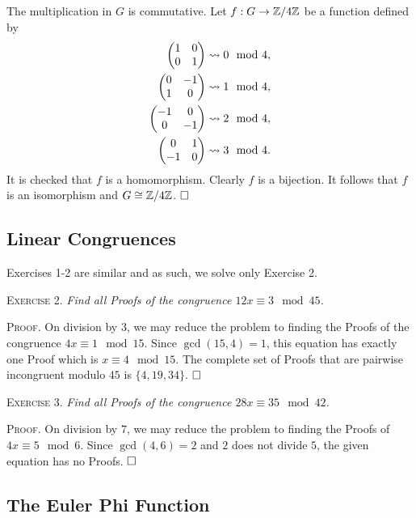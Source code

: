 \documentclass[11pt, leqno]{article}
\newcommand{\done}{\ensuremath{\hfill\square}}
\begin{document}
The multiplication in $G$ is commutative. Let $f: G \to \mathbb{Z}/4\mathbb{Z}$ be a function defined by 
\begin{align*}
  \begin{pmatrix} 1 & 0 \\ 0 & 1 \end{pmatrix} &\rightsquigarrow 0 \mod 4, \\
  \begin{pmatrix} 0 & -1 \\ 1 & 0 \end{pmatrix} &\rightsquigarrow 1 \mod 4, \\
  \begin{pmatrix} -1 & 0 \\ 0 & -1 \end{pmatrix} &\rightsquigarrow 2 \mod 4, \\
  \begin{pmatrix} 0 & 1 \\ -1 & 0 \end{pmatrix} &\rightsquigarrow 3 \mod 4.
\end{align*}
It is checked that $f$ is a homomorphism. Clearly $f$ is a bijection. It follows that $f$ is an isomorphism and $G \cong \mathbb{Z}/4\mathbb{Z}$. \done

\subsection{Linear Congruences}

Exercises 1-2 are similar and as such, we solve only Exercise 2.

\textsc{Exercise 2}. \emph{Find all Proofs of the congruence $12x \equiv 3 \mod 45$.}

\textsc{Proof}. On division by $3$, we may reduce the problem to finding the Proofs of the congruence $4x \equiv 1 \mod 15$. Since $\gcd(15,4) =1$, this equation has exactly one Proof which is $x\equiv 4 \mod 15$. The complete set of Proofs that are pairwise incongruent modulo $45$ is $\{ 4, 19, 34 \}$. \done

\textsc{Exercise 3}. \emph{Find all Proofs of the congruence $28x \equiv 35 \mod 42$.}

\textsc{Proof}. On division by $7$, we may reduce the problem to finding the Proofs of $4x \equiv 5 \mod 6$. Since $\gcd(4,6) = 2$ and $2$ does not divide $5$, the given equation has no Proofs. \done

\subsection{The Euler Phi Function}
\end{document}

